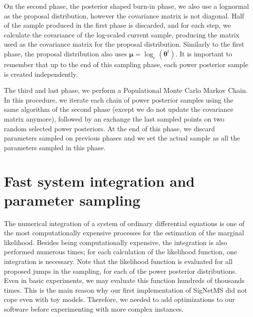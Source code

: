 On the second phase, the posterior shaped burn-in phase, we also use a 
lognormal as the proposal distribution, however the covariance matrix is 
not diagonal. Half of the sample produced in the first phase is
discarded, and for each step, we calculate the covariance of the
log-scaled current sample, producing the matrix used as the covariance
matrix for the proposal distribution. Similarly to the first phase, the
proposal distribution also uses ${\bm \mu} = \log_e({\bm \theta}^t)$. It
is important to remember that up to the end of this sampling phase, each
power posterior sample is created independently.

The third and last phase, we perform a Populational Monte Carlo Markov
Chain. In this procedure, we iterate each chain of power posterior
samples using the same algorithm of the second phase (except we do not
update the covariance matrix anymore), followed by an exchange the last
sampled points on two random selected power posteriors. At the end of
this phase, we discard parameters sampled on previous phases and we set
the actual sample as all the parameters sampled in this phase.

\section{Fast system integration and parameter sampling}
%   
The numerical integration of a system of ordinary differential equations
is one of the most computationally expensive processes for the
estimation of the marginal likelihood. Besides being computationally
expensive, the integration is also performed numerous times; for each
calculation of the likelihood function, one integration is necessary.
Note that the likelihood function is evaluated for all proposed jumps in
the sampling, for each of the power posterior distributions. Even in
basic experiments, we may evaluate this function hundreds of thousands
times. This is the main reason why our first implementation of SigNetMS
did not cope even with toy models. Therefore, we needed to add
optimizations to our software before experimenting with more complex
instances.

